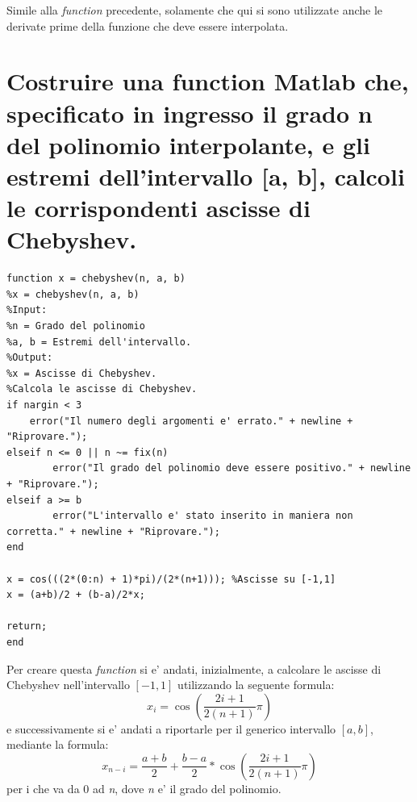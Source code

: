 \documentclass[10pt,a4paper]{article}
\begin{document}
Simile alla \textit{function} precedente, solamente che qui si sono utilizzate
anche le derivate prime della funzione che deve essere interpolata.

\section{
Costruire una function Matlab che, specificato in ingresso il grado n del polinomio
interpolante, e gli estremi dell'intervallo [a, b], calcoli le corrispondenti ascisse di Chebyshev.
}
\begin{lstlisting}[style=Matlab-editor]
function x = chebyshev(n, a, b)
%x = chebyshev(n, a, b)
%Input:
%n = Grado del polinomio
%a, b = Estremi dell'intervallo.
%Output:
%x = Ascisse di Chebyshev.
%Calcola le ascisse di Chebyshev.
if nargin < 3
    error("Il numero degli argomenti e' errato." + newline + "Riprovare.");
elseif n <= 0 || n ~= fix(n)
        error("Il grado del polinomio deve essere positivo." + newline + "Riprovare.");
elseif a >= b
        error("L'intervallo e' stato inserito in maniera non corretta." + newline + "Riprovare.");
end

x = cos(((2*(0:n) + 1)*pi)/(2*(n+1))); %Ascisse su [-1,1]
x = (a+b)/2 + (b-a)/2*x;

return;
end
\end{lstlisting}

Per creare questa \textit{function} si e' andati, inizialmente, a calcolare le ascisse
di Chebyshev nell'intervallo $ [-1, 1] $ utilizzando la seguente formula: 
\[ x_i = \cos \left( \frac{2i + 1}{2(n+1)} \pi \right) \]
e successivamente si e' andati a riportarle per il generico intervallo $ [a, b] $, 
mediante la formula:
\[ x_{n-i} = \frac{a + b}{2} + \frac{b - a}{2} * \cos \left( \frac{2i + 1}{2(n+1)} \pi \right) \]
per i che va da 0 ad \textit{n}, dove \textit{n} e' il grado del polinomio.
\end{document}
